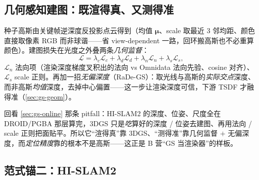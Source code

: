 \subsection{几何感知建图：既渲得真、又测得准}

种子高斯由关键帧逆深度反投影点云得到（均值 $\boldsymbol\mu$、scale 取最近 3 邻均距、颜色直接取像素 RGB 而非球谐——省 view-dependent 一路，回环搬高斯也不必重算颜色）。建图损失在光度之外叠两条\emph{几何监督}：
\begin{equation}
\mathcal L=\lambda_c\mathcal L_c+\lambda_d\mathcal L_d+\lambda_n\mathcal L_n+\lambda_s\mathcal L_s ,
\label{eq:gs-geoloss}
\end{equation}
$\mathcal L_n$ 法向项（渲染深度梯度叉积出的法向 vs Omnidata 法向先验、cosine 对齐）、$\mathcal L_s$ scale 正则。再加一招\emph{无偏深度}（RaDe-GS）：取光线与高斯的\emph{实际交点}深度、而非高斯\emph{均值}深度，去掉中心偏置——这一步让渲染深度可信，下游 TSDF 才融得准（\cref{sec:gs-geom}）。

\begin{insight}
回看 \cref{sec:gs-online} 那条 pitfall：HI-SLAM2 的深度、位姿、尺度全在 DROID/PGBA 那层算完，3DGS 只是\emph{吃}算好的深度 / 位姿去建图、再用法向 / scale 正则把面贴平。所以它“渲得真”靠 3DGS、“测得准”靠几何监督 $+$ 无偏深度，而\emph{定位精度}靠的根本不是高斯——这正是 B 营“GS 当渲染器”的样板。
\end{insight}

\subsection{范式锚二：HI-SLAM2}

